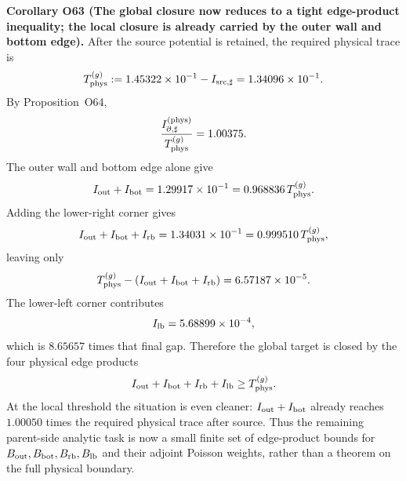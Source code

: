\documentclass[aps,prd,onecolumn,notitlepage,nofootinbib,superscriptaddress,11pt,floatfix]{revtex4-2}
\begin{document}
\medskip\noindent\textbf{Corollary O63 (The global closure now reduces to a tight edge-product inequality; the local closure is already carried by the outer wall and bottom edge).}
After the source potential is retained, the required physical trace is
\[
T_{\rm phys}^{(g)}
:=
1.45322\times10^{-1}-I_{{\rm src},\sharp}
=
1.34096\times10^{-1}.
\]
By Proposition~O64,
\[
\frac{I_{\partial,\sharp}^{(\rm phys)}}{T_{\rm phys}^{(g)}}=1.00375.
\]
The outer wall and bottom edge alone give
\[
I_{\rm out}+I_{\rm bot}=1.29917\times10^{-1}
=0.968836\,T_{\rm phys}^{(g)}.
\]
Adding the lower-right corner gives
\[
I_{\rm out}+I_{\rm bot}+I_{\rm rb}
=1.34031\times10^{-1}
=0.999510\,T_{\rm phys}^{(g)},
\]
leaving only
\[
T_{\rm phys}^{(g)}-(I_{\rm out}+I_{\rm bot}+I_{\rm rb})
=6.57187\times10^{-5}.
\]
The lower-left corner contributes
\[
I_{\rm lb}=5.68899\times10^{-4},
\]
which is \(8.65657\) times that final gap.  Therefore the global target is closed by the four physical edge products
\[
I_{\rm out}+I_{\rm bot}+I_{\rm rb}+I_{\rm lb}\ge T_{\rm phys}^{(g)}.
\]
At the local threshold the situation is even cleaner: \(I_{\rm out}+I_{\rm bot}\) already reaches \(1.00050\) times the required physical trace after source.  Thus the remaining parent-side analytic task is now a small finite set of edge-product bounds for \(B_{\rm out},B_{\rm bot},B_{\rm rb},B_{\rm lb}\) and their adjoint Poisson weights, rather than a theorem on the full physical boundary.
\end{document}
